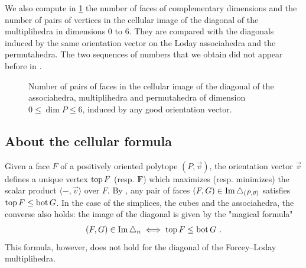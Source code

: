 \documentclass[10pt]{amsart}
\theoremstyle{remark}
\begin{document}
We also compute in \cref{table:numerology} the number of faces of complementary dimensions and the number of pairs of vertices in the cellular image of the diagonal of the multiplihedra in dimensions $0$ to $6$.
They are compared with the diagonals induced by the same orientation vector on the Loday associahedra and the permutahedra. 
The two sequences of numbers that we obtain did not appear before in \cite{OEIS}.

\medskip

\begin{figure}[h]
\caption{Number of pairs of faces in the cellular image of the diagonal of the associahedra, multiplihedra and permutahedra of dimension $0\leq \dim P \leq 6$, induced by any good orientation vector.}
\label{table:numerology}
\end{figure}

\subsection{About the cellular formula} 
\label{ss:about}

Given a face $F$ of a positively oriented polytope $(P, \vec v)$, the orientation vector $\vec v$ defines a unique vertex $\operatorname{top} F$ (resp. $\bm F$) which maximizes (resp. minimizes) the scalar product $\langle - , \vec v \rangle$ over $F$. 
By \cite[Proposition 1.17]{LA21}, any pair of faces $(F,G) \in \operatorname{Im} \triangle_{(P,\vec v)}$ satisfies $\operatorname{top} F \leq \operatorname{bot} G$. 
In the case of the simplices, the cubes and the associahedra, the converse also holds: the image of the diagonal is given by the "magical formula" 
\begin{align}
\label{eq:magical-formula}
(F,G) \in \operatorname{Im} \triangle_n \iff \operatorname{top} F\leq \operatorname{bot} G \ . 
\end{align}
This formula, however, does not hold for the diagonal of the Forcey--Loday multiplihedra. 
\end{document}
